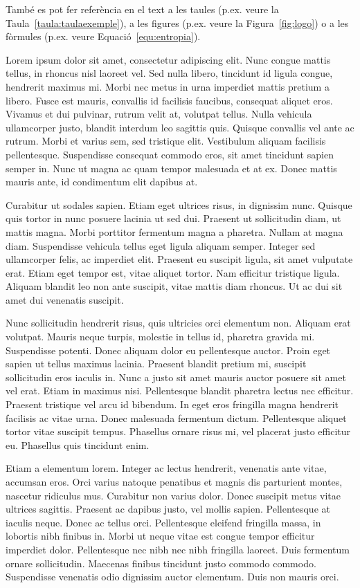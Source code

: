 \documentclass[a4paper,12pt,twoside]{ThesisStyle}
\begin{document}
També es pot fer referència en el text a les taules (p.ex. veure la Taula~\ref{taula:taulaexemple}), a les figures (p.ex. veure la Figura~\ref{fig:logo}) o a les fòrmules (p.ex. veure Equació~\ref{equ:entropia}).

Lorem ipsum dolor sit amet, consectetur adipiscing elit. Nunc congue mattis tellus, in rhoncus nisl laoreet vel. Sed nulla libero, tincidunt id ligula congue, hendrerit maximus mi. Morbi nec metus in urna imperdiet mattis pretium a libero. Fusce est mauris, convallis id facilisis faucibus, consequat aliquet eros. Vivamus et dui pulvinar, rutrum velit at, volutpat tellus. Nulla vehicula ullamcorper justo, blandit interdum leo sagittis quis. Quisque convallis vel ante ac rutrum. Morbi et varius sem, sed tristique elit. Vestibulum aliquam facilisis pellentesque. Suspendisse consequat commodo eros, sit amet tincidunt sapien semper in. Nunc ut magna ac quam tempor malesuada et at ex. Donec mattis mauris ante, id condimentum elit dapibus at.

Curabitur ut sodales sapien. Etiam eget ultrices risus, in dignissim nunc. Quisque quis tortor in nunc posuere lacinia ut sed dui. Praesent ut sollicitudin diam, ut mattis magna. Morbi porttitor fermentum magna a pharetra. Nullam at magna diam. Suspendisse vehicula tellus eget ligula aliquam semper. Integer sed ullamcorper felis, ac imperdiet elit. Praesent eu suscipit ligula, sit amet vulputate erat. Etiam eget tempor est, vitae aliquet tortor. Nam efficitur tristique ligula. Aliquam blandit leo non ante suscipit, vitae mattis diam rhoncus. Ut ac dui sit amet dui venenatis suscipit.

Nunc sollicitudin hendrerit risus, quis ultricies orci elementum non. Aliquam erat volutpat. Mauris neque turpis, molestie in tellus id, pharetra gravida mi. Suspendisse potenti. Donec aliquam dolor eu pellentesque auctor. Proin eget sapien ut tellus maximus lacinia. Praesent blandit pretium mi, suscipit sollicitudin eros iaculis in. Nunc a justo sit amet mauris auctor posuere sit amet vel erat. Etiam in maximus nisi. Pellentesque blandit pharetra lectus nec efficitur. Praesent tristique vel arcu id bibendum. In eget eros fringilla magna hendrerit facilisis ac vitae urna. Donec malesuada fermentum dictum. Pellentesque aliquet tortor vitae suscipit tempus. Phasellus ornare risus mi, vel placerat justo efficitur eu. Phasellus quis tincidunt enim.

Etiam a elementum lorem. Integer ac lectus hendrerit, venenatis ante vitae, accumsan eros. Orci varius natoque penatibus et magnis dis parturient montes, nascetur ridiculus mus. Curabitur non varius dolor. Donec suscipit metus vitae ultrices sagittis. Praesent ac dapibus justo, vel mollis sapien. Pellentesque at iaculis neque. Donec ac tellus orci. Pellentesque eleifend fringilla massa, in lobortis nibh finibus in. Morbi ut neque vitae est congue tempor efficitur imperdiet dolor. Pellentesque nec nibh nec nibh fringilla laoreet. Duis fermentum ornare sollicitudin. Maecenas finibus tincidunt justo commodo commodo. Suspendisse venenatis odio dignissim auctor elementum. Duis non mauris orci.
\end{document}
